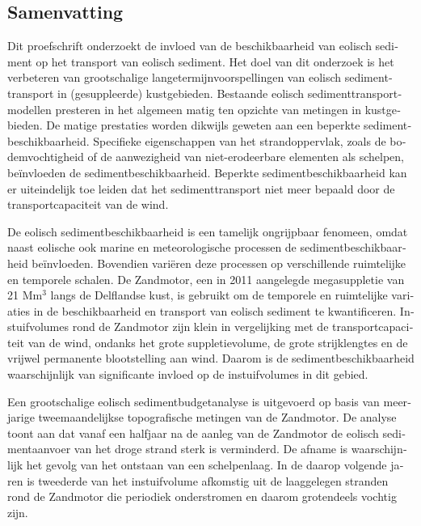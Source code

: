 \begin{otherlanguage}{dutch}
\chapter*{Samenvatting}
Dit proefschrift onderzoekt de invloed van de beschikbaarheid van
eolisch sediment op het transport van eolisch sediment. Het doel van
dit onderzoek is het verbeteren van grootschalige
langetermijnvoorspellingen van eolisch sedimenttransport in
(gesuppleerde) kustgebieden. Bestaande eolisch
sedimenttransportmodellen presteren in het algemeen matig ten opzichte
van metingen in kustgebieden. De matige prestaties worden dikwijls
geweten aan een beperkte sedimentbeschikbaarheid. Specifieke
eigenschappen van het strandoppervlak, zoals de bodemvochtigheid of de
aanwezigheid van niet-erodeerbare elementen als schelpen,
be{\"i}nvloeden de sedimentbeschikbaarheid. Beperkte
sedimentbeschikbaarheid kan er uiteindelijk toe leiden dat het
sedimenttransport niet meer bepaald door de transportcapaciteit van de
wind.

De eolisch sedimentbeschikbaarheid is een tamelijk ongrijpbaar
fenomeen, omdat naast eolische ook marine en meteorologische processen
de sedimentbeschikbaarheid be{\"i}nvloeden. Bovendien vari{\"e}ren
deze processen op verschillende ruimtelijke en temporele schalen. De
Zandmotor, een in 2011 aangelegde megasuppletie van 21 $\mathrm{Mm^3}$
langs de Delflandse kust, is gebruikt om de temporele en ruimtelijke
variaties in de beschikbaarheid en transport van eolisch sediment te
kwantificeren. Instuifvolumes rond de Zandmotor zijn klein in
vergelijking met de transportcapaciteit van de wind, ondanks het grote
suppletievolume, de grote strijklengtes en de vrijwel permanente
blootstelling aan wind. Daarom is de sedimentbeschikbaarheid
waarschijnlijk van significante invloed op de instuifvolumes in dit
gebied.

Een grootschalige eolisch sedimentbudgetanalyse is uitgevoerd op basis
van meerjarige tweemaandelijkse topografische metingen van de
Zandmotor. De analyse toont aan dat vanaf een halfjaar na de aanleg
van de Zandmotor de eolisch sedimentaanvoer van het droge strand sterk
is verminderd. De afname is waarschijnlijk het gevolg van het ontstaan
van een schelpenlaag. In de daarop volgende jaren is tweederde van het
instuifvolume afkomstig uit de laaggelegen stranden rond de Zandmotor
die periodiek onderstromen en daarom grotendeels vochtig zijn.


\end{otherlanguage}
